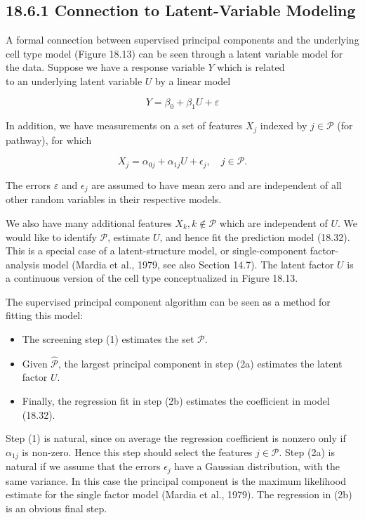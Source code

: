 \documentclass[10pt]{article}
\begin{document}
\subsection*{18.6.1 Connection to Latent-Variable Modeling}
A formal connection between supervised principal components and the underlying cell type model (Figure 18.13) can be seen through a latent variable model for the data. Suppose we have a response variable $Y$ which is related\\
to an underlying latent variable $U$ by a linear model


\begin{equation*}
Y=\beta_{0}+\beta_{1} U+\varepsilon \tag{18.32}
\end{equation*}


In addition, we have measurements on a set of features $X_{j}$ indexed by $j \in \mathcal{P}$ (for pathway), for which


\begin{equation*}
X_{j}=\alpha_{0 j}+\alpha_{1 j} U+\epsilon_{j}, \quad j \in \mathcal{P} . \tag{18.33}
\end{equation*}


The errors $\varepsilon$ and $\epsilon_{j}$ are assumed to have mean zero and are independent of all other random variables in their respective models.

We also have many additional features $X_{k}, k \notin \mathcal{P}$ which are independent of $U$. We would like to identify $\mathcal{P}$, estimate $U$, and hence fit the prediction model (18.32). This is a special case of a latent-structure model, or single-component factor-analysis model (Mardia et al., 1979, see also Section 14.7). The latent factor $U$ is a continuous version of the cell type conceptualized in Figure 18.13.

The supervised principal component algorithm can be seen as a method for fitting this model:

\begin{itemize}
  \item The screening step (1) estimates the set $\mathcal{P}$.
  \item Given $\widehat{\mathcal{P}}$, the largest principal component in step (2a) estimates the latent factor $U$.
  \item Finally, the regression fit in step (2b) estimates the coefficient in model (18.32).
\end{itemize}

Step (1) is natural, since on average the regression coefficient is nonzero only if $\alpha_{1 j}$ is non-zero. Hence this step should select the features $j \in \mathcal{P}$. Step (2a) is natural if we assume that the errors $\epsilon_{j}$ have a Gaussian distribution, with the same variance. In this case the principal component is the maximum likelihood estimate for the single factor model (Mardia et al., 1979). The regression in (2b) is an obvious final step.
\end{document}
